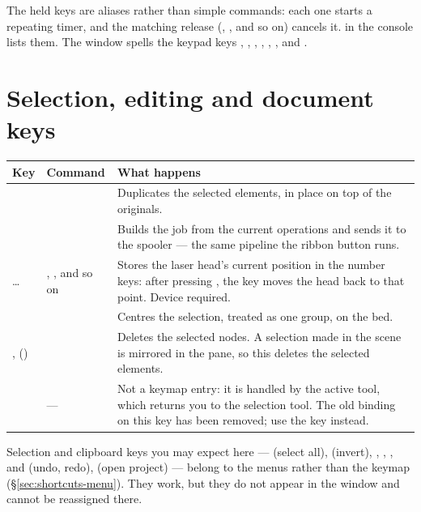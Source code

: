 \noindent The held keys are aliases rather than simple commands: each one starts
a repeating timer, and the matching release (, ,
and so on) cancels it.  in the console lists them. The 
window spells the keypad keys , ,
, , , ,
 and .

\section{Selection, editing and document keys}

\begin{center}\small
\begin{tabular}{@{}L{3.0cm}L{5.8cm}L{6.0cm}@{}}
\toprule
\textbf{Key} & \textbf{Command} & \textbf{What happens} \\
\midrule
{} &  & Duplicates the selected elements, in place on
top of the originals. \\
 &  & Builds the job from the current operations and sends it to the spooler
--- the same pipeline the ribbon  button runs. \\
 \ldots{}  & , , and so on & Stores the laser head's current position in the number keys:
after pressing , the key  moves the head back to that point.
Device required. \\
 &  & Centres the
selection, treated as one group, on the bed. \\
,  () & 
& Deletes the selected nodes. A selection made in the scene is mirrored in the
 pane, so this deletes the selected elements. \\
 & --- & Not a keymap entry: it is handled by the active tool, which
returns you to the selection tool. The old  binding on this key has
been removed; use the  key instead. \\
\bottomrule
\end{tabular}
\end{center}

\noindent Selection and clipboard keys you may expect here --- 
(select all),  (invert), , , ,
 and  (undo, redo),  (open project) ---
belong to the menus rather than the keymap (\S\ref{sec:shortcuts-menu}). They
work, but they do not appear in the  window and cannot be
reassigned there.

